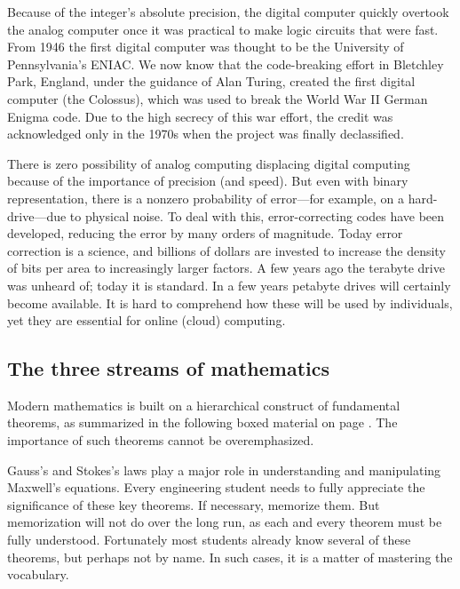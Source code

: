 \documentclass{ximera}
\begin{document}
Because of the integer's absolute precision, the digital computer quickly overtook the analog computer
once it was practical to make logic circuits that were fast.
From 1946 the first digital computer was thought to be the University of Pennsylvania's ENIAC.
We now know that the code-breaking effort in Bletchley Park, England, under the guidance of Alan Turing,
created the first digital computer (the Colossus), which was used to break the World War II German Enigma code. 
Due to the high secrecy of this war effort, the credit was acknowledged only in the 1970s when the project
was finally declassified.

There is zero possibility of analog computing displacing digital computing because of the importance of
precision (and speed).  But even with binary representation, there is a nonzero probability of
error---for  example, on a hard-drive---due to physical noise. To deal with this, error-correcting codes have been
developed, reducing the error by many orders of magnitude. Today error correction is a science,
and billions of dollars are invested to increase the density of bits per area to increasingly
larger factors.  A few years ago the terabyte drive was unheard of; today it is standard. In a
few years petabyte drives will certainly become available.  It is hard to comprehend how these will
be used by individuals, yet they are essential for online (cloud) computing.


\subsection {The three streams of mathematics}
Modern mathematics is built on a hierarchical construct of fundamental theorems, as summarized in the following boxed material  on page \pageref{box:FundamentalThms}.
The importance of such theorems cannot be overemphasized.

Gauss's and Stokes's laws play a major role in understanding and manipulating Maxwell's equations.
Every
engineering student needs to fully appreciate the significance of these key theorems. If necessary, memorize them.
But memorization will not do over the long run, as each and every theorem must be fully understood.
Fortunately most students already know several of these theorems, but perhaps not by name.  In such cases, it is a matter of mastering the vocabulary.
\end{document}

